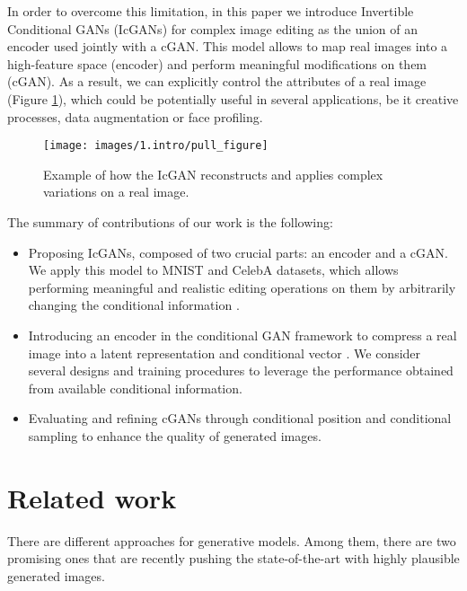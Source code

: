 \documentclass{article}
\begin{document}
In order to overcome this limitation, in this paper we introduce Invertible Conditional GANs (IcGANs) for complex image editing as the union of an encoder used jointly with a cGAN. This model allows to map real images into a high-feature space (encoder) and perform meaningful modifications on them (cGAN). As a result, we can explicitly control the attributes of a real image (Figure \ref{fig:icgan_example}), which could be potentially useful in several applications, be it creative processes, data augmentation or face profiling.

\begin{figure}[t]
        \centering
        \texttt{[image: images/1.intro/pull\_figure]}
        \caption{Example of how the IcGAN reconstructs and applies complex variations on a real image.}
        \label{fig:icgan_example}
\end{figure}

\begin{minipage}{\linewidth} The summary of contributions of our work is the following:
\begin{itemize}
\item Proposing IcGANs, composed of two crucial parts: an encoder and a cGAN. We apply this model to MNIST \citep{LeCun1998} and CelebA \citep{celeba} datasets, which allows performing meaningful and realistic editing operations on them by arbitrarily changing the conditional information .   
\item Introducing an encoder in the conditional GAN framework to compress a real image  into a latent representation  and conditional vector . We consider several designs and training procedures to leverage the performance obtained from available conditional information.
\item Evaluating and refining cGANs through conditional position and conditional sampling to enhance the quality of generated images.
\end{itemize}
\end{minipage} 
\section{Related work} \label{sec:state_of_art}
There are different approaches for generative models. Among them, there are two promising ones that are recently pushing the state-of-the-art with highly plausible generated images.
\end{document}
